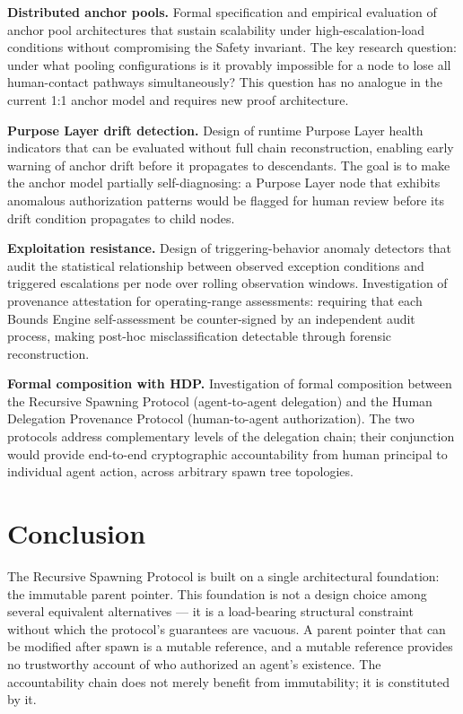 \medskip
\noindent\textbf{Distributed anchor pools.} Formal specification and empirical evaluation of anchor pool architectures that sustain scalability under high-escalation-load conditions without compromising the Safety invariant. The key research question: under what pooling configurations is it provably impossible for a node to lose all human-contact pathways simultaneously? This question has no analogue in the current 1:1 anchor model and requires new proof architecture.

\medskip
\noindent\textbf{Purpose Layer drift detection.} Design of runtime Purpose Layer health indicators that can be evaluated without full chain reconstruction, enabling early warning of anchor drift before it propagates to descendants. The goal is to make the anchor model partially self-diagnosing: a Purpose Layer node that exhibits anomalous authorization patterns would be flagged for human review before its drift condition propagates to child nodes.

\medskip
\noindent\textbf{Exploitation resistance.} Design of triggering-behavior anomaly detectors that audit the statistical relationship between observed exception conditions and triggered escalations per node over rolling observation windows. Investigation of provenance attestation for operating-range assessments: requiring that each Bounds Engine self-assessment be counter-signed by an independent audit process, making post-hoc misclassification detectable through forensic reconstruction.

\medskip
\noindent\textbf{Formal composition with HDP.} Investigation of formal composition between the Recursive Spawning Protocol (agent-to-agent delegation) and the Human Delegation Provenance Protocol (human-to-agent authorization). The two protocols address complementary levels of the delegation chain; their conjunction would provide end-to-end cryptographic accountability from human principal to individual agent action, across arbitrary spawn tree topologies.

\section{Conclusion}
\label{sec:conclusion}

The Recursive Spawning Protocol is built on a single architectural foundation: the immutable parent pointer. This foundation is not a design choice among several equivalent alternatives — it is a load-bearing structural constraint without which the protocol's guarantees are vacuous. A parent pointer that can be modified after spawn is a mutable reference, and a mutable reference provides no trustworthy account of who authorized an agent's existence. The accountability chain does not merely benefit from immutability; it is constituted by it.

